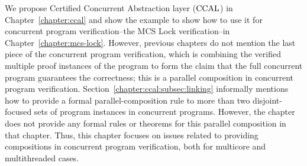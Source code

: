    

We propose Certified Concurrent Abstraction layer ($\mathrm{CCAL}$) in Chapter~\ref{chapter:ccal} and show the example to show how to use it for concurrent program verification--the MCS Lock verification--in Chapter~\ref{chapter:mcs-lock}.
However, previous chapters do not mention the last piece of the concurrent program verification, which is
combining the verified multiple proof instances of the program
to form the claim that the full concurrent program guarantees the correctness; this is
 a parallel composition in concurrent program verification.
Section~\ref{chapter:ccal:subsec:linking}
 informally mentions how to provide a formal parallel-composition rule to more than two disjoint-focused sets of program instances in concurrent programs.
However, the chapter does not provide any formal rules or theorems for this parallel composition in that chapter.
Thus, this chapter focuses on  issues related to providing compositions in concurrent program verification,
both for multicore and multithreaded cases.

